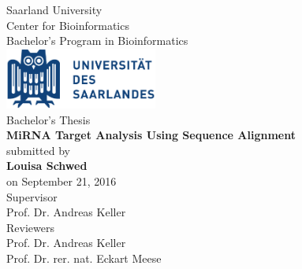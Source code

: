 \documentclass[11pt, a4paper, twoside]{book}
\begin{document}
\def\supervisorIname{Advisor I}
\def\supervisorIIname{Second Reviewer}

	\def\university{Saarland Universitiy}
	\def\institute{Center for Bioinformatics}
	\def\chair{Bachelor's Program in Bioinformatics}
	\def\projectname{MiRNA Target Analysis Using Sequence Alignment}
	\vspace{.2em}  
	\def\author{Louisa Schwed}
	\def\date{September 2016}

\begin{titlepage}

  \begin{minipage}{\textwidth}
    \begin{center}
    { \large Saarland University \\ Center for Bioinformatics\\ Bachelor's Program in Bioinformatics \\}
	\vspace{1.5cm}
    \includegraphics[width=5cm]{Logo-Universitaet_des_Saarlandes.pdf}\\
    \vspace{1.5cm}
    { \large Bachelor's Thesis\\}
    \vspace{0.5cm}
    {\huge\textbf{\projectname}}\\
    \vspace{1.5cm}
    { \large submitted by}\\
	\vspace{0.5cm}
    {\large\textbf{\author}}\\
    \vspace{0.5cm}
    {\large on September 21, 2016}\\
    \vspace{1.5cm}
    {\large Supervisor}\\
    \vspace{0.5cm}
    {\large Prof. Dr. Andreas Keller}\\
    \vspace{1.5cm}
    {\large Reviewers}\\
    \vspace{0.5cm}
    {\large Prof. Dr. Andreas Keller}\\
   	{\large Prof. Dr. rer. nat. Eckart Meese}\\
    \vspace{0.5cm}
    \end{center}
  \end{minipage}   
   

\end{titlepage}
\end{document}

